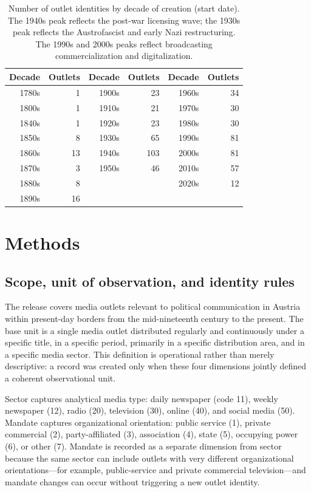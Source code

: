 \documentclass[11pt]{article}
\begin{document}
\begin{table}[t]
  \centering
  \small
  \begin{tabular}{rr|rr|rr}
    \toprule
    Decade & Outlets & Decade & Outlets & Decade & Outlets \\
    \midrule
    1780s & 1  & 1900s & 23 & 1960s & 34 \\
    1800s & 1  & 1910s & 21 & 1970s & 30 \\
    1840s & 1  & 1920s & 23 & 1980s & 30 \\
    1850s & 8  & 1930s & 65 & 1990s & 81 \\
    1860s & 13 & 1940s & 103 & 2000s & 81 \\
    1870s & 3  & 1950s & 46 & 2010s & 57 \\
    1880s & 8  & & & 2020s & 12 \\
    1890s & 16 & & & & \\
    \bottomrule
  \end{tabular}
  \caption{Number of outlet identities by decade of creation (start date). The 1940s peak reflects the post-war licensing wave; the 1930s peak reflects the Austrofascist and early Nazi restructuring. The 1990s and 2000s peaks reflect broadcasting commercialization and digitalization.}
  \label{tab:decades}
\end{table}

\section{Methods}

\subsection{Scope, unit of observation, and identity rules}

The release covers media outlets relevant to political communication in Austria within present-day borders from the mid-nineteenth century to the present. The base unit is a single media outlet distributed regularly and continuously under a specific title, in a specific period, primarily in a specific distribution area, and in a specific media sector. This definition is operational rather than merely descriptive: a record was created only when these four dimensions jointly defined a coherent observational unit.

Sector captures analytical media type: daily newspaper (code 11), weekly newspaper (12), radio (20), television (30), online (40), and social media (50). Mandate captures organizational orientation: public service (1), private commercial (2), party-affiliated (3), association (4), state (5), occupying power (6), or other (7). Mandate is recorded as a separate dimension from sector because the same sector can include outlets with very different organizational orientations---for example, public-service and private commercial television---and mandate changes can occur without triggering a new outlet identity.
\end{document}
